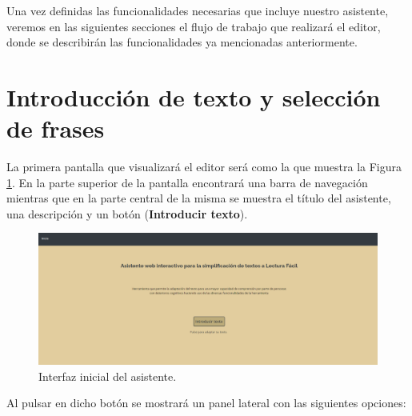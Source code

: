  

Una vez definidas las funcionalidades necesarias que incluye nuestro asistente, veremos en las siguientes secciones el flujo de trabajo que realizará el editor, donde se describirán las funcionalidades ya mencionadas anteriormente.

\section{Introducción de texto y selección de frases}
\label{introduccionTextoYFrases}
 La primera pantalla que visualizará el editor será como la que muestra la Figura \ref{fig:interfazInicial}. En la parte superior de la pantalla encontrará una barra de navegación mientras que en la parte central de la misma se muestra el título del asistente, una descripción y un botón (\textbf{Introducir texto}). 
  \begin{figure}[h!]
 	\centering
 	
 	
 	\includegraphics[scale=0.4]{Imagenes/Figuras/InterfazInicial}
 	
 	
 	\caption{Interfaz inicial del asistente.}
 	\label{fig:interfazInicial}
 \end{figure}
 
 Al pulsar en dicho botón se mostrará un panel lateral con las siguientes opciones:
 
